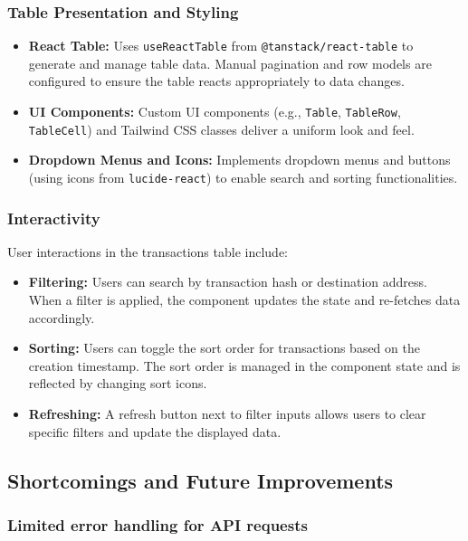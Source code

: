 \subsubsection{Table Presentation and Styling}
\begin{itemize}
    \item \textbf{React Table:} Uses \texttt{useReactTable} from \texttt{@tanstack/react-table} to generate and manage table data. Manual pagination and row models are configured to ensure the table reacts appropriately to data changes.
    \item \textbf{UI Components:} Custom UI components (e.g., \texttt{Table}, \texttt{TableRow}, \texttt{TableCell}) and Tailwind CSS classes deliver a uniform look and feel.
    \item \textbf{Dropdown Menus and Icons:} Implements dropdown menus and buttons (using icons from \texttt{lucide-react}) to enable search and sorting functionalities.
\end{itemize}

\subsubsection{Interactivity}
User interactions in the transactions table include:
\begin{itemize}
    \item \textbf{Filtering:} Users can search by transaction hash or destination address. When a filter is applied, the component updates the state and re-fetches data accordingly.
    \item \textbf{Sorting:} Users can toggle the sort order for transactions based on the creation timestamp. The sort order is managed in the component state and is reflected by changing sort icons.
    \item \textbf{Refreshing:} A refresh button next to filter inputs allows users to clear specific filters and update the displayed data.
\end{itemize}


\subsection{Shortcomings and Future Improvements}



\subsubsection{Limited error handling for API requests}

